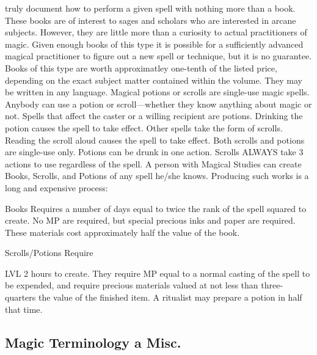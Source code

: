 \documentclass[twoside]{book}
\begin{document}
               truly document how to perform a given spell with nothing
               more than a book. These books are of interest to sages and
               scholars who are interested in arcane subjects. However,
               they are little more than a curiosity to actual
               practitioners of magic. Given enough books of this type it
               is possible for a sufficiently advanced magical
               practitioner to figure out a new spell or technique, but
               it is no guarantee. Books of this type are worth
               approximatley one-tenth of the listed price, depending on
               the exact subject matter contained within the volume. They
               may be written in any language.   Magical potions or scrolls are single-use magic
               spells. Anybody can use a potion or scroll—whether
               they know anything about magic or not. Spells that affect
               the caster or a willing recipient are potions. Drinking
               the potion causes the spell to take effect. Other spells
               take the form of scrolls. Reading the scroll aloud causes
               the spell to take effect. Both scrolls and potions are
               single-use only. Potions can be drunk in one action.
               Scrolls ALWAYS take 3 actions to use regardless of the
               spell.   A person with Magical Studies can create Books,
               Scrolls, and Potions of any spell he/she knows. Producing
               such works is a long and expensive process:   
              
                  Books   Requires a number of
                  days equal to twice the rank of the spell squared to
                  create. No MP are required, but special precious inks
                  and paper are required. These materials cost
                  approximately half the value of the book.
                
              
                   Scrolls/Potions   Require
                     
                       LVL  2 
                        hours       to create.
                      They require MP equal to a normal casting of the
                      spell to be expended, and require precious
                      materials valued at not less than three-quarters
                      the value of the finished item. A ritualist may
                      prepare a potion in half that time.
                
            
\subsection{Magic Terminology a Misc.}
      
\end{document}
